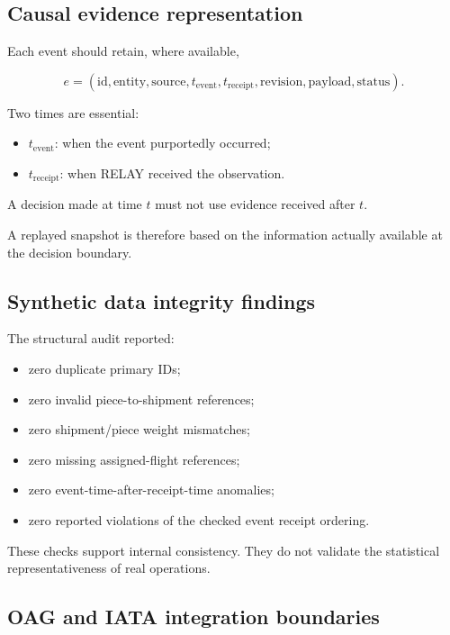 \documentclass[10pt,a4paper]{article}
\theoremstyle{plain}
\theoremstyle{definition}
\theoremstyle{remark}
\begin{document}
\subsection{Causal evidence representation}

Each event should retain, where available,

\[
e=
(
\text{id},
\text{entity},
\text{source},
t_{\mathrm{event}},
t_{\mathrm{receipt}},
\text{revision},
\text{payload},
\text{status}
).
\]

Two times are essential:

\begin{itemize}[leftmargin=18pt,itemsep=2pt]
\item
\(t_{\mathrm{event}}\):
when the event purportedly occurred;
\item
\(t_{\mathrm{receipt}}\):
when RELAY received the observation.
\end{itemize}

A decision made at time \(t\)
must not use evidence received after \(t\).

A replayed snapshot is therefore based on
the information actually available
at the decision boundary.

\subsection{Synthetic data integrity findings}

The structural audit reported:

\begin{itemize}[leftmargin=18pt,itemsep=2pt]
\item zero duplicate primary IDs;
\item zero invalid piece-to-shipment references;
\item zero shipment/piece weight mismatches;
\item zero missing assigned-flight references;
\item zero event-time-after-receipt-time anomalies;
\item zero reported violations of
the checked event receipt ordering.
\end{itemize}

These checks support internal consistency.
They do not validate the statistical
representativeness of real operations.

\subsection{OAG and IATA integration boundaries}
\end{document}
